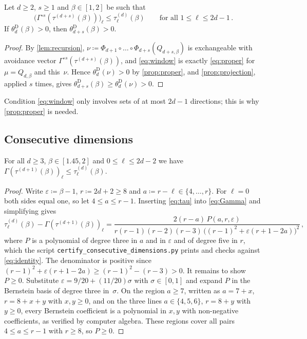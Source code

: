 \documentclass[11pt,letterpaper]{article}
\begin{document}
\begin{proposition}\label{prop:principle}
Let $d\ge2$, $s\ge1$ and $\beta\in[1,2]$ be such that
\begin{equation}\label{eq:window}
\big(\Gamma^{\circ s}(\tau^{(d+s)}(\beta))\big)_\ell\le\tau^{(d)}_\ell(\beta)\qquad\text{for all }1\le\ell\le2d-1\,.
\end{equation}
If $\theta^{\mathrm D}_d(\beta)>0$, then $\theta^{\mathrm D}_{d+s}(\beta)>0$.
\end{proposition}

\begin{proof}
By \cref{lem:recursion}, $\nu\coloneqq\Phi_{d+1}\circ\dots\circ\Phi_{d+s}(Q_{d+s,\beta})$ is exchangeable with avoidance vector $\Gamma^{\circ s}(\tau^{(d+s)}(\beta))$, and \eqref{eq:window} is exactly \eqref{eq:proper} for $\mu=Q_{d,\beta}$ and this~$\nu$. Hence $\theta^{\mathrm D}_d(\nu)>0$ by \cref{prop:proper}, and \cref{prop:projection}, applied $s$ times, gives $\theta^{\mathrm D}_{d+s}(\beta)\ge\theta^{\mathrm D}_d(\nu)>0$.
\end{proof}

Condition \eqref{eq:window} only involves sets of at most $2d-1$ directions; this is why \cref{prop:proper} is needed.

\subsection{Consecutive dimensions}

\begin{lemma}\label{lem:consecutive}
For all $d\ge3$, $\beta\in[1.45,2]$ and $0\le\ell\le2d-2$ we have $\Gamma(\tau^{(d+1)}(\beta))_\ell\le\tau^{(d)}_\ell(\beta)$.
\end{lemma}

\begin{proof}
Write $\varepsilon\coloneqq\beta-1$, $r\coloneqq2d+2\ge8$ and $a\coloneqq r-\ell\in\{4,\dots,r\}$. For $\ell=0$ both sides equal one, so let $4\le a\le r-1$. Inserting \eqref{eq:tau} into \eqref{eq:Gamma} and simplifying gives
\begin{equation}\label{eq:identity}
\tau^{(d)}_\ell(\beta)-\Gamma(\tau^{(d+1)}(\beta))_\ell=\frac{2(r-a)\,P(a,r,\varepsilon)}{r(r-1)(r-2)(r-3)\,\big((r-1)^2+\varepsilon(r+1-2a)\big)^2}\,,
\end{equation}
where $P$ is a polynomial of degree three in $a$ and in $\varepsilon$ and of degree five in $r$, which the script \texttt{certify\_consecutive\_dimensions.py} prints and checks against \eqref{eq:identity}. The denominator is positive since $(r-1)^2+\varepsilon(r+1-2a)\ge(r-1)^2-(r-3)>0$. It remains to show $P\ge0$. Substitute $\varepsilon=9/20+(11/20)\sigma$ with $\sigma\in[0,1]$ and expand $P$ in the Bernstein basis of degree three in~$\sigma$. On the region $a\ge7$, written as $a=7+x$, $r=8+x+y$ with $x,y\ge0$, and on the three lines $a\in\{4,5,6\}$, $r=8+y$ with $y\ge0$, every Bernstein coefficient is a polynomial in $x,y$ with non-negative coefficients, as verified by computer algebra. These regions cover all pairs $4\le a\le r-1$ with $r\ge8$, so $P\ge0$.
\end{proof}
\end{document}
